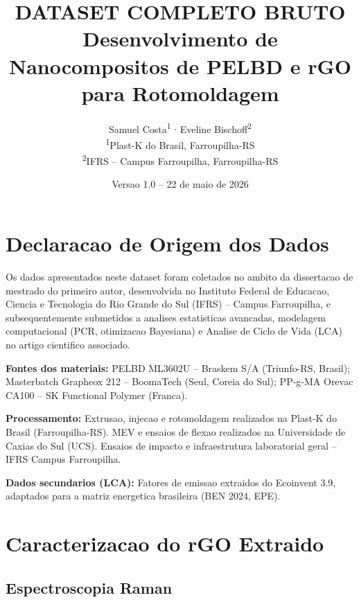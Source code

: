 \documentclass[11pt,a4paper]{article}
\title{\textbf{DATASET COMPLETO BRUTO}\\[4pt]
\large Desenvolvimento de Nanocompositos de PELBD e rGO para Rotomoldagem}
\author{Samuel Costa\textsuperscript{1} $\cdot$ Eveline Bischoff\textsuperscript{2}\\[4pt]
\textsuperscript{1}Plast-K do Brasil, Farroupilha-RS\\
\textsuperscript{2}IFRS -- Campus Farroupilha, Farroupilha-RS}
\date{Versao 1.0 -- 22 de maio de 2026}
\begin{document}
\maketitle

\section*{Declaracao de Origem dos Dados}

Os dados apresentados neste dataset foram coletados no ambito da dissertacao de mestrado do primeiro autor, desenvolvida no Instituto Federal de Educacao, Ciencia e Tecnologia do Rio Grande do Sul (IFRS) -- Campus Farroupilha, e subsequentemente submetidos a analises estatisticas avancadas, modelagem computacional (PCR, otimizacao Bayesiana) e Analise de Ciclo de Vida (LCA) no artigo cientifico associado.

\vspace{6pt}
{\bfseries Fontes dos materiais:} PELBD ML3602U -- Braskem S/A (Triunfo-RS, Brasil); Masterbatch Grapheox 212 -- BoomaTech (Seul, Coreia do Sul); PP-g-MA Orevac CA100 -- SK Functional Polymer (Franca).

\vspace{6pt}
{\bfseries Processamento:} Extrusao, injecao e rotomoldagem realizados na Plast-K do Brasil (Farroupilha-RS). MEV e ensaios de flexao realizados na Universidade de Caxias do Sul (UCS). Ensaios de impacto e infraestrutura laboratorial geral -- IFRS Campus Farroupilha.

\vspace{6pt}
{\bfseries Dados secundarios (LCA):} Fatores de emissao extraidos do Ecoinvent 3.9, adaptados para a matriz energetica brasileira (BEN 2024, EPE).

\newpage
\tableofcontents
\newpage

\section{Caracterizacao do rGO Extraido}

\subsection{Espectroscopia Raman}
\end{document}
